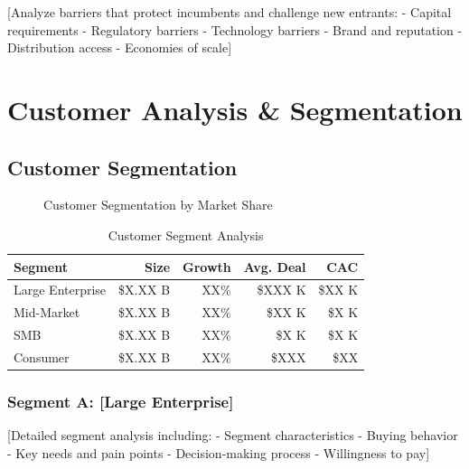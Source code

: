\documentclass[11pt,letterpaper]{report}
\begin{document}
[Analyze barriers that protect incumbents and challenge new entrants:
- Capital requirements
- Regulatory barriers
- Technology barriers
- Brand and reputation
- Distribution access
- Economies of scale]

\chapter{Customer Analysis \& Segmentation}

\section{Customer Segmentation}


\begin{figure}[htbp]
\centering
\caption{Customer Segmentation by Market Share}
\label{fig:customer_segments}
\end{figure}

\begin{table}[htbp]
\centering
\caption{Customer Segment Analysis}
\begin{tabular}{@{}lrrrr@{}}
\toprule
\textbf{Segment} & \textbf{Size} & \textbf{Growth} & \textbf{Avg. Deal} & \textbf{CAC} \\
\midrule
Large Enterprise & \$X.XX B & XX\% & \$XXX K & \$XX K \\
\rowcolor{tablealt} Mid-Market & \$X.XX B & XX\% & \$XX K & \$X K \\
SMB & \$X.XX B & XX\% & \$X K & \$X K \\
\rowcolor{tablealt} Consumer & \$X.XX B & XX\% & \$XXX & \$XX \\
\bottomrule
\end{tabular}
\label{tab:customer_segments}
\end{table}

\subsection{Segment A: [Large Enterprise]}
[Detailed segment analysis including:
- Segment characteristics
- Buying behavior
- Key needs and pain points
- Decision-making process
- Willingness to pay]
\end{document}
